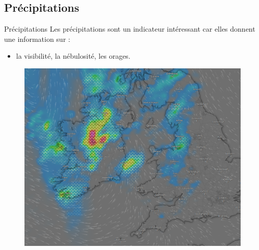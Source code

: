 \documentclass{beamer}
\begin{document}
\subsection{Précipitations}
\begin{frame}{Précipitations}
  Les précipitations sont un indicateur intéressant car elles donnent une information sur :
  \pause
  \begin{itemize}
    \item la visibilité, \pause la nébulosité, \pause les orages.
  \end{itemize}

  \begin{figure}
    \centering
    \includegraphics[scale=0.5]{images/windy-rain.png}
  \end{figure}
\end{frame}
\end{document}
